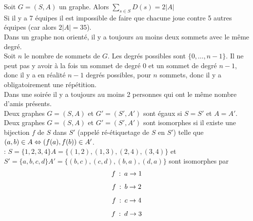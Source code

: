  Soit $G = (S,A)$ un graphe. Alors $\displaystyle{\sum_{s\in S}D(s) = 2|A|}$\\

 Si il y a 7 équipes il est impossible de faire que chacune joue contre 5 autres équipes (car alors $2|A| = 35$). \\

 Dans un graphe non orienté, il y a toujours au moins deux sommets avec le même degré.\\

 Soit $n$ le nombre de sommets de $G$. Les degrés possibles sont $\{0, \ldots, n-1\}$. Il ne peut pas y avoir à la fois un sommet de degré $0$ et un sommet de degré $n-1$, donc il y a en réalité $n-1$ degrés possibles, pour $n$ sommets, donc il y a obligatoirement une répétition. \\

 Dans une soirée il y a toujours au moins 2 personnes qui ont le même nombre d'amis présents. \\

 Deux graphes $G = (S,A)$ et $G' = (S',A')$ sont égaux si $S = S'$ et $A = A'$. \\
Deux graphes $G=(S,A)$ et $G'=(S',A')$ sont isomorphes si il existe une bijection $f$ de $S$ dans $S'$ (appelé ré-étiquetage de $S$ en $S'$) telle que $(a,b) \in A \Leftrightarrow (f(a),f(b)) \in A'$. \\

 : $S = \{1,2,3,4\} A = \{(1,2),(1,3),(2,4),(3,4)\}$ et $S'=\{a,b,c,d\} A'=\{(b,c),(c,d),(b,a),(d,a)\}$ sont isomorphes par $$f\: : \: a \rightarrow 1$$ $$f\: : \: b \rightarrow 2$$ $$f\: : \: c \rightarrow 4$$ $$f\: : \: d \rightarrow 3$$
